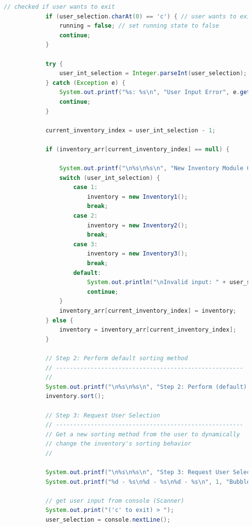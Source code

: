 \documentclass[12pt]{article}
\begin{document}
\begin{lstlisting}[language=Java]
            // checked if user wants to exit
            if (user_selection.charAt(0) == 'c') { // user wants to exit
                running = false; // set running state to false
                continue;
            }

            try {
                user_int_selection = Integer.parseInt(user_selection);
            } catch (Exception e) {
                System.out.printf("%s: %s\n", "User Input Error", e.getMessage());
                continue;
            }

            current_inventory_index = user_int_selection - 1;

            if (inventory_arr[current_inventory_index] == null) {

                System.out.printf("\n%s\n%s\n", "New Inventory Module Created", dv);
                switch (user_int_selection) {
                    case 1:
                        inventory = new Inventory1();
                        break;
                    case 2:
                        inventory = new Inventory2();
                        break;
                    case 3:
                        inventory = new Inventory3();
                        break;
                    default:
                        System.out.println("\nInvalid input: " + user_selection);
                        continue;
                }
                inventory_arr[current_inventory_index] = inventory;
            } else {
                inventory = inventory_arr[current_inventory_index];
            }

            // Step 2: Perform default sorting method
            // ------------------------------------------------------
            //
            System.out.printf("\n%s\n%s\n", "Step 2: Perform (default) Sorting Method", dv);
            inventory.sort();

            // Step 3: Request User Selection
            // ------------------------------------------------------
            // Get a new sorting method from the user to dynamically
            // change the inventory's sorting behavior
            //
            
            System.out.printf("\n%s\n%s\n", "Step 3: Request User Selection (Sorting Method)", dv);
            System.out.printf("%d - %s\n%d - %s\n%d - %s\n", 1, "BubbleSort", 2, "MergeSort", 3, "QuickSort");

            // get user input from console (Scanner)
            System.out.print("('c' to exit) > ");
            user_selection = console.nextLine();


\end{lstlisting}
\end{document}
